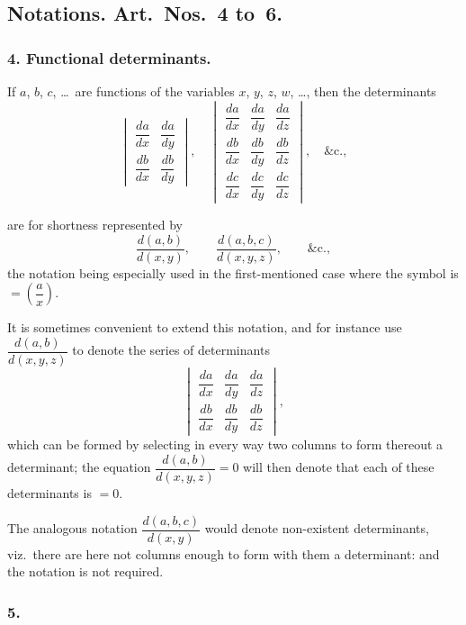 \documentclass[12pt,a4paper]{article}
\theoremstyle{plain}
\begin{document}
\subsection*{Notations. Art.~Nos.~4 to~6.}

\subsubsection*{4. Functional determinants.}

If $a$, $b$, $c$, \ldots\ are functions of the variables $x$, $y$, $z$, $w$, \ldots, then the determinants
\[
\begin{vmatrix}
\dfrac{da}{dx} & \dfrac{da}{dy} \\[0.8em]
\dfrac{db}{dx} & \dfrac{db}{dy}
\end{vmatrix},
\quad
\begin{vmatrix}
\dfrac{da}{dx} & \dfrac{da}{dy} & \dfrac{da}{dz} \\[0.5em]
\dfrac{db}{dx} & \dfrac{db}{dy} & \dfrac{db}{dz} \\[0.5em]
\dfrac{dc}{dx} & \dfrac{dc}{dy} & \dfrac{dc}{dz}
\end{vmatrix},
\quad \&\text{c.},
\]

\newpage
\setcounter{page}{116}

are for shortness represented by
\[
\frac{d(a, b)}{d(x, y)}, \qquad \frac{d(a, b, c)}{d(x, y, z)}, \qquad \&\text{c.},
\]
the notation being especially used in the first-mentioned case where the symbol is $= \left(\dfrac{a}{x}\right)$.

It is sometimes convenient to extend this notation, and for instance use $\dfrac{d(a, b)}{d(x, y, z)}$ to denote the series of determinants
\[
\begin{vmatrix}
\dfrac{da}{dx} & \dfrac{da}{dy} & \dfrac{da}{dz} \\[0.5em]
\dfrac{db}{dx} & \dfrac{db}{dy} & \dfrac{db}{dz}
\end{vmatrix},
\]
which can be formed by selecting in every way two columns to form thereout a determinant; the equation $\dfrac{d(a, b)}{d(x, y, z)} = 0$ will then denote that each of these determinants is $= 0$.

The analogous notation $\dfrac{d(a, b, c)}{d(x, y)}$ would denote non-existent determinants, viz.~there are here not columns enough to form with them a determinant: and the notation is not required.

\subsubsection*{5.}
\end{document}
